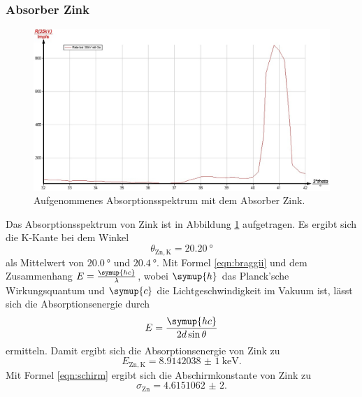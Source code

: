 \subsubsection{Absorber Zink}
\begin{figure}
	\includegraphics[width=1.0\textwidth]{nIKO_und_jULIAN_ÜLADS/zink.jpg}
	\caption{Aufgenommenes Absorptionsspektrum mit dem Absorber Zink.}
	\label{fig:zink_absorber}
\end{figure}
Das Absorptionsspektrum von Zink ist in Abbildung \ref{fig:zink_absorber} aufgetragen.
Es ergibt sich die K-Kante bei dem Winkel
\begin{equation*}
	\theta_{\mathrm{Zn,K}} = \SI{20,20}{\degree}
\end{equation*}
als Mittelwert von $\SI{20,0}{\degree}$ und $\SI{20,4}{\degree}$. 
Mit Formel \eqref{eqn:braggii} und dem Zusammenhang $E = \frac{\symup{hc}}{\lambda}$,
wobei $\symup{h}$
das Planck'sche Wirkungsquantum und $\symup{c}$ die Lichtgeschwindigkeit im Vakuum ist, lässt
sich die Absorptionsenergie durch
\begin{equation}
	\label{eqn:Absorptionsenergie}
	E = \frac{\symup{hc}}{2d\sin\theta}
\end{equation}
ermitteln.
Damit ergibt sich die Absorptionsenergie von Zink zu
\begin{equation*}
	E_{\mathrm{Zn,K}} = \SI{8,9142038(1)}{\kilo\electronvolt} \mathrm{.}
\end{equation*}
Mit Formel \eqref{eqn:schirm} ergibt sich die Abschirmkonstante von Zink zu
\begin{equation*}
	\sigma_{\mathrm{Zn}} = \num{4,6151062(2)} \mathrm{.}
\end{equation*}

\FloatBarrier
